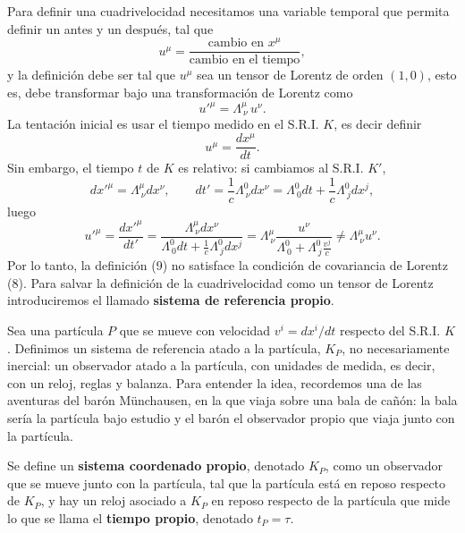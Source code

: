\begin{center}
\end{center}

Para definir una cuadrivelocidad necesitamos una variable temporal que
permita definir un antes y un después, tal que
\[
u^\mu = \frac{\text{cambio en } x^\mu}{\text{cambio en el tiempo}},
\]
y la definición debe ser tal que $u^\mu$ sea un tensor de Lorentz de
orden $(1,0)$, esto es, debe transformar bajo una transformación de
Lorentz como
\[
u'^\mu = \Lambda^\mu_{\ \nu}\,u^\nu . \tag{8}
\]
La tentación inicial es usar el tiempo medido en el S.R.I. $K$, es decir
definir
\[
u^\mu = \frac{dx^\mu}{dt} . \tag{9}
\]
Sin embargo, el tiempo $t$ de $K$ es relativo: si cambiamos al S.R.I.
$K'$,
\[
dx'^\mu = \Lambda^\mu_{\ \nu}dx^\nu, \qquad dt' = \frac1c\Lambda^0_{\
\nu}dx^\nu = \Lambda^0_{\ 0}dt + \frac1c\Lambda^0_{\ j}dx^j,
\]
luego
\[
u'^\mu = \frac{dx'^\mu}{dt'} = \frac{\Lambda^\mu_{\ \nu}dx^\nu}{
\Lambda^0_{\ 0}dt+\frac1c\Lambda^0_{\ j}dx^j} = \Lambda^\mu_{\ \nu}
\frac{u^\nu}{\Lambda^0_{\ 0}+\Lambda^0_{\ j}\frac{v^j}{c}} \neq
\Lambda^\mu_{\ \nu}u^\nu .
\]
Por lo tanto, la definición (9) no satisface la condición de covariancia
de Lorentz (8). Para salvar la definición de la cuadrivelocidad como un
tensor de Lorentz introduciremos el llamado \textbf{sistema de
referencia propio}.

Sea una partícula $P$ que se mueve con velocidad $v^i=dx^i/dt$ respecto
del S.R.I. $K$. Definimos un sistema de referencia atado a la partícula,
$K_P$, no necesariamente inercial: un observador atado a la partícula,
con unidades de medida, es decir, con un reloj, reglas y balanza. Para
entender la idea, recordemos una de las aventuras del barón Münchausen,
en la que viaja sobre una bala de cañón: la bala sería la partícula bajo
estudio y el barón el observador propio que viaja junto con la
partícula.

\begin{definicion}
Se define un \textbf{sistema coordenado propio}, denotado $K_P$, como un
observador que se mueve junto con la partícula, tal que la partícula
está en reposo respecto de $K_P$, y hay un reloj asociado a $K_P$ en
reposo respecto de la partícula que mide lo que se llama el
\textbf{tiempo propio}, denotado $t_P=\tau$.
\end{definicion}


